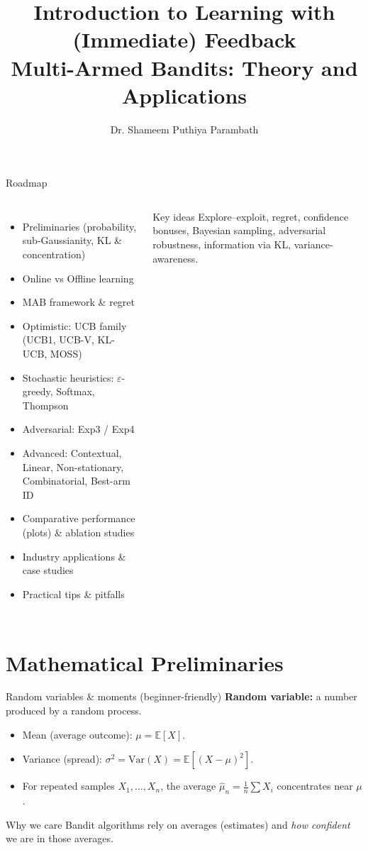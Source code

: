 \documentclass[aspectratio=169]{beamer}
\title[Learning with (immediate) Feedback: MAB]{Introduction to Learning with (Immediate) Feedback\\\small Multi-Armed Bandits: Theory and Applications}
\author{Dr. Shameem Puthiya Parambath}
\institute{University of Glasgow}
\date{}
\newcommand{\E}{\mathbb{E}}
\newcommand{\Var}{\mathrm{Var}}
\begin{document}
\begin{frame}
  \titlepage
\end{frame}

\begin{frame}{Roadmap}
  \begin{columns}[T,onlytextwidth]
    \begin{itemize}
      \item Preliminaries (probability, sub-Gaussianity, KL \& concentration)
      \item Online vs Offline learning
      \item MAB framework \& regret
      \item Optimistic: UCB family (UCB1, UCB-V, KL-UCB, MOSS)
      \item Stochastic heuristics: $\varepsilon$-greedy, Softmax, Thompson
      \item Adversarial: Exp3 / Exp4
      \item Advanced: Contextual, Linear, Non-stationary, Combinatorial, Best-arm ID
      \item Comparative performance (plots) \& ablation studies
      \item Industry applications \& case studies
      \item Practical tips \& pitfalls
    \end{itemize}
    \begin{block}{Key ideas}
      \small Explore–exploit, regret, confidence bonuses, Bayesian sampling, adversarial robustness, information via KL, variance-awareness.
    \end{block}
  \end{columns}
\end{frame}

\section{Mathematical Preliminaries}

\begin{frame}{Random variables \& moments (beginner-friendly)}
\small
\textbf{Random variable:} a number produced by a random process.
\begin{itemize}
  \item Mean (average outcome): $\mu=\E[X]$.
  \item Variance (spread): $\sigma^2=\Var(X)=\E[(X-\mu)^2]$.
  \item For repeated samples $X_1,\dots,X_n$, the average $\hat{\mu}_n=\frac{1}{n}\sum X_i$ concentrates near $\mu$.
\end{itemize}
\begin{block}{Why we care}
Bandit algorithms rely on averages (estimates) and \emph{how confident} we are in those averages.
\end{block}
\end{frame}
\end{document}
